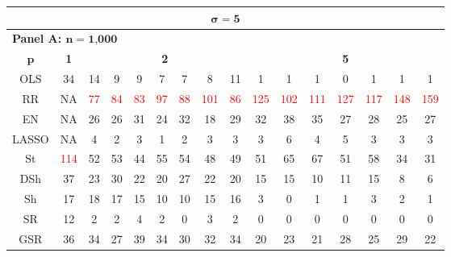 \begin{table}
{\begin{tabular*}{\textwidth}{@{\extracolsep{\fill}}c|c|ccccccc|ccccccc@{}}
\multicolumn{16}{c}{$\bm\sigma=\textbf{5}$}\\
\hline

\multicolumn{16}{l}{\textbf{Panel A: $\bm n=\textbf{1,000}$}}\\
\hline
$\bm p$ & \textbf{1} & \multicolumn{7}{c|}{\textbf{2}} & \multicolumn{7}{c}{\textbf{5}} \\
\hline
OLS & 34 & 14 & 9 & 9 & 7 & 7 & 8 & 11 & 1 & 1 & 1 & 0 & 1 & 1 & 1 \\
RR & NA & \textcolor{red}{77} & \textcolor{red}{84} & \textcolor{red}{83} & \textcolor{red}{97} & \textcolor{red}{88} & \textcolor{red}{101} & \textcolor{red}{86} & \textcolor{red}{125} & \textcolor{red}{102} & \textcolor{red}{111} & \textcolor{red}{127} & \textcolor{red}{117} & \textcolor{red}{148} & \textcolor{red}{159} \\
EN & NA & 26 & 26 & 31 & 24 & 32 & 18 & 29 & 32 & 38 & 35 & 27 & 28 & 25 & 27 \\
LASSO & NA & 4 & 2 & 3 & 1 & 2 & 3 & 3 & 3 & 6 & 4 & 5 & 3 & 3 & 3 \\
St & \textcolor{red}{114} & 52 & 53 & 44 & 55 & 54 & 48 & 49 & 51 & 65 & 67 & 51 & 58 & 34 & 31 \\
DSh & 37 & 23 & 30 & 22 & 20 & 27 & 22 & 20 & 15 & 15 & 10 & 11 & 15 & 8 & 6 \\
Sh & 17 & 18 & 17 & 15 & 10 & 10 & 15 & 16 & 3 & 0 & 1 & 1 & 3 & 2 & 1 \\
SR & 12 & 2 & 2 & 4 & 2 & 0 & 3 & 2 & 0 & 0 & 0 & 0 & 0 & 0 & 0 \\
GSR & 36 & 34 & 27 & 39 & 34 & 30 & 32 & 34 & 20 & 23 & 21 & 28 & 25 & 29 & 22 \\
\hline


\end{tabular*}}
\end{table}
